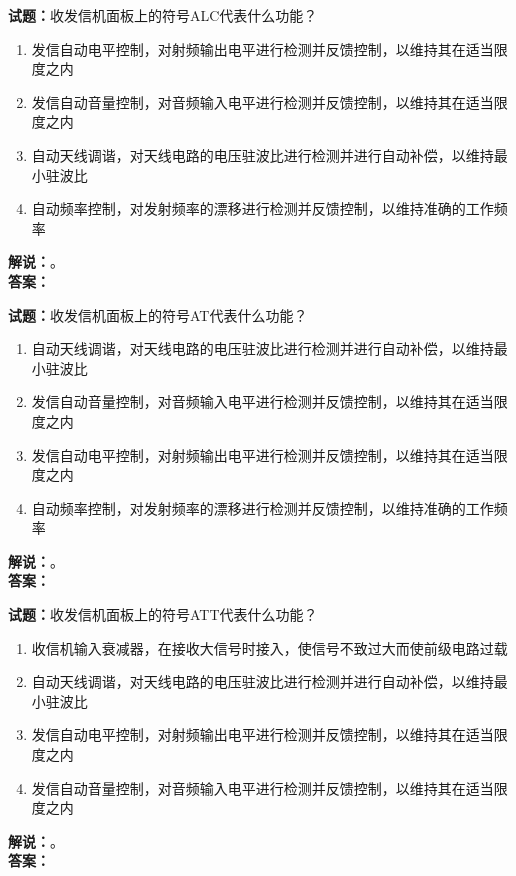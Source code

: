\documentclass{ctexbook}
\begin{document}
\vspace{\baselineskip}

\noindent\textbf{试题：}收发信机面板上的符号ALC代表什么功能？
\begin{enumerate}[leftmargin=3em]
  \item 发信自动电平控制，对射频输出电平进行检测并反馈控制，以维持其在适当限度之内
  \item 发信自动音量控制，对音频输入电平进行检测并反馈控制，以维持其在适当限度之内
  \item 自动天线调谐，对天线电路的电压驻波比进行检测并进行自动补偿，以维持最小驻波比
  \item 自动频率控制，对发射频率的漂移进行检测并反馈控制，以维持准确的工作频率
\end{enumerate}
\noindent\textbf{解说：}\textbf{}。\\\noindent\textbf{答案：}

\vspace{\baselineskip}

\noindent\textbf{试题：}收发信机面板上的符号AT代表什么功能？
\begin{enumerate}[leftmargin=3em]
  \item 自动天线调谐，对天线电路的电压驻波比进行检测并进行自动补偿，以维持最小驻波比
  \item 发信自动音量控制，对音频输入电平进行检测并反馈控制，以维持其在适当限度之内
  \item 发信自动电平控制，对射频输出电平进行检测并反馈控制，以维持其在适当限度之内
  \item 自动频率控制，对发射频率的漂移进行检测并反馈控制，以维持准确的工作频率
\end{enumerate}
\noindent\textbf{解说：}\textbf{}。\\\noindent\textbf{答案：}

\vspace{\baselineskip}

\noindent\textbf{试题：}收发信机面板上的符号ATT代表什么功能？
\begin{enumerate}[leftmargin=3em]
  \item 收信机输入衰减器，在接收大信号时接入，使信号不致过大而使前级电路过载
  \item 自动天线调谐，对天线电路的电压驻波比进行检测并进行自动补偿，以维持最小驻波比
  \item 发信自动电平控制，对射频输出电平进行检测并反馈控制，以维持其在适当限度之内
  \item 发信自动音量控制，对音频输入电平进行检测并反馈控制，以维持其在适当限度之内
\end{enumerate}
\noindent\textbf{解说：}\textbf{}。\\\noindent\textbf{答案：}
\end{document}
